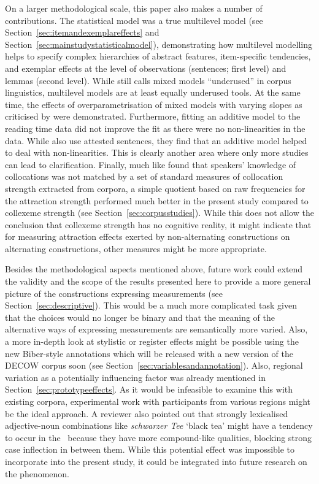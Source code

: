 On a larger methodological scale, this paper also makes a number of contributions.
The statistical model was a true multilevel model (see Section~\ref{sec:itemandexemplareffects} and Section~\ref{sec:mainstudystatisticalmodel}), demonstrating how multilevel modelling helps to specify complex hierarchies of abstract features, item-specific tendencies, and exemplar effects at the level of observations (sentences; first level) and lemmas (second level).
While \cite{Gries2015} still calls mixed models ``underused'' in corpus linguistics, multilevel models are at least equally underused tools.
At the same time, the effects of overparametrisation of mixed models with varying slopes as criticised by \cite{BatesEa2015a} were demonstrated.
Furthermore, fitting an additive model to the reading time data did not improve the fit as there were no non-linearities in the data.
While \cite{DivjakEa2016} also use attested sentences, they find that an additive model helped to deal with non-linearities.
This is clearly another area where only more studies can lead to clarification.
Finally, much like \cite{Dabrowska2014} found that speakers' knowledge of collocations was not matched by a set of standard measures of collocation strength extracted from corpora, a simple quotient based on raw frequencies for the attraction strength performed much better in the present study compared to collexeme strength (see Section~\ref{sec:corpusstudies}).
While this does not allow the conclusion that collexeme strength has no cognitive reality, it might indicate that for measuring attraction effects exerted by non-alternating constructions on alternating constructions, other measures might be more appropriate.

Besides the methodological aspects mentioned above, future work could extend the validity and the scope of the results presented here to provide a more general picture of the constructions expressing measurements (see Section~\ref{sec:descriptive}).
This would be a much more complicated task given that the choices would no longer be binary and that the meaning of the alternative ways of expressing measurements are semantically more varied.
Also, a more in-depth look at stylistic or register effects might be possible using the new Biber-style annotations which will be released with a new version of the DECOW corpus soon (see Section~\ref{sec:variablesandannotation}).
Also, regional variation as a potentially influencing factor was already mentioned in Section~\ref{sec:prototypeeffects}.
As it would be infeasible to examine this with existing corpora, experimental work with participants from various regions might be the ideal approach.
A reviewer also pointed out that strongly lexicalised adjective-noun combinations like \textit{schwarzer Tee} `black tea' might have a tendency to occur in the \NACa\ because they have more compound-like qualities, blocking strong case inflection in between them.
While this potential effect was impossible to incorporate into the present study, it could be integrated into future research on the phenomenon.

